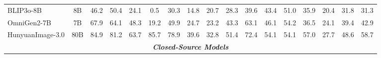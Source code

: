 \begin{table}[t]
{\begin{tabular}{lcccccccccccccccc}
BLIP3o-8B                        & 8B                                 & 46.2                                 & 50.4                                 & 24.1                                 & 0.5                                  & \cellcolor[HTML]{E2E2E2}30.3                                 & 14.8                                 & 20.7                                 & 28.3                                 & 39.6                                 & 43.4                                 & 51.0                                 & 35.9                                 & 20.4                                 & \cellcolor[HTML]{E2E2E2}31.8                                 & 31.3                                 \\
OmniGen2-7B                      & 7B                                 & 67.9                                 & 64.1                                 & 48.3                                 & 19.2                                 & \cellcolor[HTML]{E2E2E2}49.9                                 & 24.7                                 & 23.2                                 & 43.3                                 & 63.1                                 & 46.1                                 & 54.2                                 & 36.5                                 & 24.1                                 & \cellcolor[HTML]{E2E2E2}39.4                                 & 42.9                                 \\
HunyuanImage-3.0                 & 80B                                & 84.9                                 & 81.2                                 & 63.7                                 & 85.7                                 & \cellcolor[HTML]{E2E2E2}78.9                                 & 39.6                                 & 32.8                                 & 51.4                                 & 72.4                                 & 54.1                                 & 54.1                                 & 57.0                                 & 27.7                                 & \cellcolor[HTML]{E2E2E2}48.6                                 & 58.7                                 \\ \midrule
\multicolumn{17}{c}{\textit{\textbf{Closed-Source Models}}}                                                                                                                                                                                                                                                                                                                                                                                                                                                                                                                                                                                                                                                                    \\ \midrule

\end{tabular}}
\end{table}
